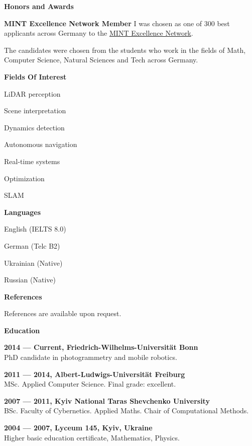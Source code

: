 \documentclass[a4paper,12pt,final]{memoir}
\newcommand{\Sep}{\vspace{1.5em}}
\newcommand{\SmallSep}{\vspace{0.5em}}
\newcommand{\CVSection}[1]
	{\Large\textbf{#1}\par
	\SmallSep\normalsize\normalfont}
\newcommand{\CVItem}[1]
	{\textbf{\color{MidnightBlue} #1}}
\begin{document}
	\CVSection{Honors and Awards}
	\CVItem{MINT Excellence Network Member}
	I was chosen as one of 300 best applicants across Germany to the
	\href{http://www.mlp.de/#/studenten/karriere/stipendienprogramme/mint-excellence}
	{MINT Excellence Network}.

	The candidates were chosen from the students who work in the fields of Math,
	Computer Science, Natural Sciences and Tech across Germany.
	\Sep{}

	\CVSection{Fields Of Interest}
	\begin{compactitem}[\color{MidnightBlue}$\circ$]
		\item LiDAR perception
		\item Scene interpretation
		\item Dynamics detection
		\item Autonomous navigation
		\item Real-time systems
		\item Optimization
		\item SLAM
	\end{compactitem}
	\Sep{}

	\CVSection{Languages}
	\begin{compactitem}[\color{MidnightBlue}$\circ$]
		\item English (IELTS 8.0)
		\item German (Telc B2)
		\item Ukrainian (Native)
		\item Russian (Native)
	\end{compactitem}
	\Sep{}

	\CVSection{References}
	References are available upon request.
	\Sep{}

\vfill
\framebreak{}

\CVSection{Education}
\CVItem{2014 --- Current, Friedrich-Wilhelms-Universit\"at Bonn}\\
PhD candidate in photogrammetry and mobile robotics.
\SmallSep{}

\CVItem{2011 --- 2014, Albert-Ludwigs-Universit\"at Freiburg}\\
MSc. Applied Computer Science. Final grade: excellent.
\SmallSep{}

\CVItem{2007 --- 2011, Kyiv National Taras Shevchenko University}\\
BSc. Faculty of Cybernetics. Applied Maths.
\newline Chair of Computational Methods.
\SmallSep{}

\CVItem{2004 --- 2007, Lyceum 145, Kyiv, Ukraine}\\
Higher basic education certificate, Mathematics, Physics.
\SmallSep{}
\end{document}

